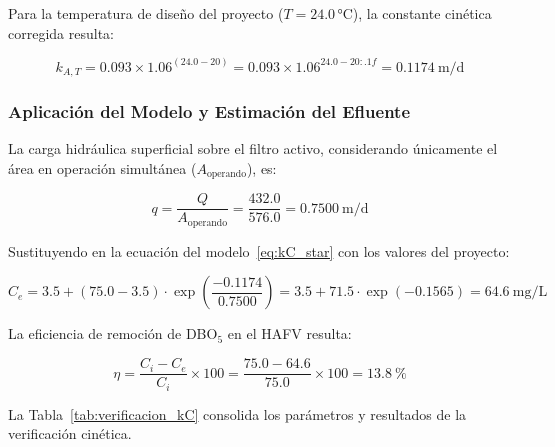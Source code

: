 \documentclass[12pt,a4paper]{article}
\newcommand{\captionequation}[1]{}
\begin{document}
Para la temperatura de diseño del proyecto ($T = 24.0$\,°C), la constante cinética corregida resulta:

\begin{equation}
k_{A,T} = 0.093 \times 1.06^{(24.0 - 20)} = 0.093 \times 1.06^{24.0 - 20:.1f} = 0.1174\ \text{m/d}
\end{equation}
\captionequation{Constante cinética de remoción de DBO$_5$ corregida a $T = 24.0$\,°C}

\subsubsection*{Aplicación del Modelo y Estimación del Efluente}

La carga hidráulica superficial sobre el filtro activo, considerando únicamente el área en operación simultánea ($A_\text{operando}$), es:

\begin{equation}
q = \frac{Q}{A_\text{operando}} = \frac{432.0}{576.0} = 0.7500\ \text{m/d}
\end{equation}
\captionequation{Carga hidráulica superficial del filtro activo ($q$) -- parámetro de entrada del modelo k-C*}

Sustituyendo en la ecuación del modelo~\eqref{eq:kC_star} con los valores del proyecto:

\begin{equation}
C_e = 3.5 + (75.0 - 3.5) \cdot \exp\!\left(\frac{-0.1174}{0.7500}\right) = 3.5 + 71.5 \cdot \exp(-0.1565) = 64.6\ \text{mg/L}
\end{equation}
\captionequation{Concentración estimada de DBO$_5$ en el efluente del HAFV -- Modelo k-C*}

La eficiencia de remoción de DBO$_5$ en el HAFV resulta:

\begin{equation}
\eta = \frac{C_i - C_e}{C_i} \times 100 = \frac{75.0 - 64.6}{75.0} \times 100 = 13.8\ \%
\end{equation}
\captionequation{Eficiencia de remoción de DBO$_5$ en el HAFV}

La Tabla~\ref{tab:verificacion_kC} consolida los parámetros y resultados de la verificación cinética.
\end{document}
